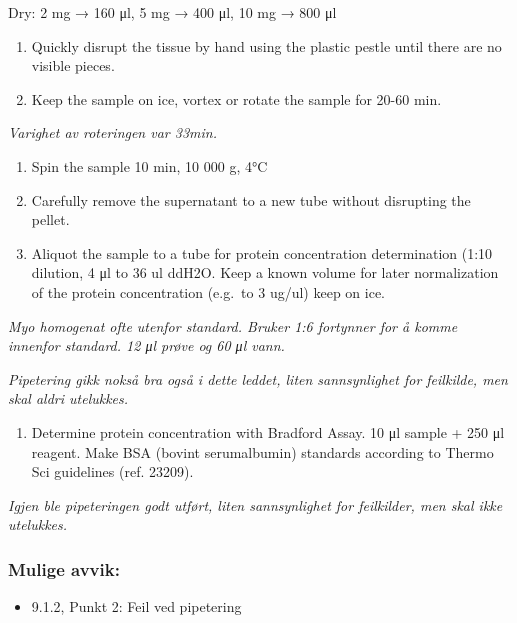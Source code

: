 \documentclass[
  letterpaper,
  DIV=11,
  numbers=noendperiod]{scrreprt}
\providecommand{\tightlist}{%
  \setlength{\itemsep}{0pt}\setlength{\parskip}{0pt}}\usepackage{longtable,booktabs,array}
\begin{document}
Dry: 2 mg → 160 μl, 5 mg → 400 μl, 10 mg → 800 μl

\begin{enumerate}
\def\labelenumi{\arabic{enumi}.}
\setcounter{enumi}{3}
\item
  Quickly disrupt the tissue by hand using the plastic pestle until
  there are no visible pieces.
\item
  Keep the sample on ice, vortex or rotate the sample for 20-60 min.
\end{enumerate}

\emph{Varighet av roteringen var 33min.}

\begin{enumerate}
\def\labelenumi{\arabic{enumi}.}
\setcounter{enumi}{5}
\item
  Spin the sample 10 min, 10 000 g, 4°C
\item
  Carefully remove the supernatant to a new tube without disrupting the
  pellet.
\item
  Aliquot the sample to a tube for protein concentration determination
  (1:10 dilution, 4 μl to 36 ul ddH2O. Keep a known volume for later
  normalization of the protein concentration (e.g.~to 3 ug/ul) keep on
  ice.
\end{enumerate}

\emph{Myo homogenat ofte utenfor standard. Bruker 1:6 fortynner for å
komme innenfor standard. 12 μl prøve og 60 μl vann.}

\emph{Pipetering gikk nokså bra også i dette leddet, liten sannsynlighet
for feilkilde, men skal aldri utelukkes.}

\begin{enumerate}
\def\labelenumi{\arabic{enumi}.}
\setcounter{enumi}{8}
\tightlist
\item
  Determine protein concentration with Bradford Assay. 10 μl sample +
  250 μl reagent. Make BSA (bovint serumalbumin) standards according to
  Thermo Sci guidelines (ref. 23209).
\end{enumerate}

\emph{Igjen ble pipeteringen godt utført, liten sannsynlighet for
feilkilder, men skal ikke utelukkes.}

\subsubsection{Mulige avvik:}\label{mulige-avvik}

\begin{itemize}
\tightlist
\item
  9.1.2, Punkt 2: Feil ved pipetering
\end{itemize}
\end{document}

